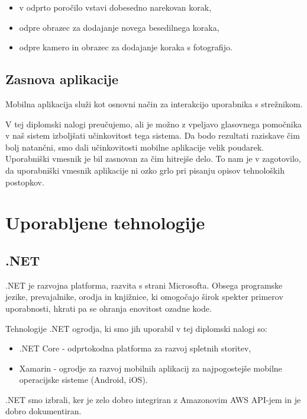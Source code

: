 \documentclass[a4paper, 12pt]{book}
\begin{document}
\begin{itemize}
	\item v odprto poročilo vstavi dobesedno narekovan korak,
	\item odpre obrazec za dodajanje novega besedilnega koraka,
	\item odpre kamero in obrazec za dodajanje koraka s fotografijo.
\end{itemize}


\subsection{Zasnova aplikacije}

Mobilna aplikacija služi kot osnovni način za interakcijo uporabnika s strežnikom.

V tej diplomski nalogi preučujemo, ali je možno z vpeljavo glasovnega pomočnika v naš sistem izboljšati učinkovitost tega sistema.
Da bodo rezultati raziskave čim bolj natančni, smo dali učinkovitosti mobilne aplikacije velik poudarek.
Uporabniški vmesnik je bil zasnovan za čim hitrejše delo.
To nam je v zagotovilo, da uporabniški vmesnik aplikacije ni ozko grlo pri pisanju opisov tehnoloških postopkov.

\section{Uporabljene tehnologije}

\subsection{.NET}

.NET \cite{dotnet} je razvojna platforma, razvita s strani Microsofta.
Obsega programske jezike, prevajalnike, orodja in knjižnice, ki omogočajo širok spekter primerov uporabnosti, hkrati pa se ohranja enovitost ozadne kode.

Tehnologije .NET ogrodja, ki smo jih uporabil v tej diplomski nalogi so:
\begin{itemize}
	\item .NET Core - odprtokodna platforma za razvoj spletnih storitev,
	\item Xamarin - ogrodje za razvoj mobilnih aplikacij za najpogostejše mobilne operacijske sisteme (Android, iOS).
\end{itemize}

.NET smo izbrali, ker je zelo dobro integriran z Amazonovim AWS API-jem in je dobro dokumentiran.
\end{document}
